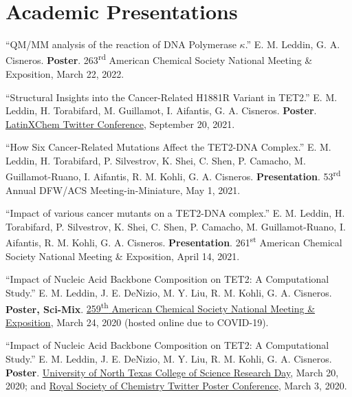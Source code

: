 \documentclass[letterpaper,11pt]{article}
\begin{document}
\section{Academic Presentations}
\begin{etaremune}[start=17]
  \item \textnormal{``QM/MM analysis of the reaction of DNA Polymerase $\kappa$.'' E. M. Leddin, G. A. Cisneros. \textbf{Poster}. 263\textsuperscript{rd} American Chemical Society National Meeting \& Exposition, March 22, 2022.}
  \item \textnormal{``Structural Insights into the Cancer-Related H1881R Variant in TET2.'' E. M. Leddin, H. Torabifard, M. Guillamot, I. Aifantis, G. A. Cisneros. \textbf{Poster}. \href{https://doi.org/10.26226/morressier.616e5c2362ba8657678b1294}{LatinXChem Twitter Conference}, September 20, 2021.}
  \item \textnormal{``How Six Cancer-Related Mutations Affect the
TET2-DNA Complex.'' E. M. Leddin, H. Torabifard, P. Silvestrov, K. Shei, C. Shen, P. Camacho, M. Guillamot-Ruano, I. Aifantis, R. M. Kohli, G. A. Cisneros. \textbf{Presentation}. 53\textsuperscript{rd} Annual DFW/ACS Meeting-in-Miniature, May 1, 2021.}
  \item \textnormal{``Impact of various cancer mutants on a TET2-DNA complex.'' E. M. Leddin, H. Torabifard, P. Silvestrov, K. Shei, C. Shen, P. Camacho, M. Guillamot-Ruano, I. Aifantis, R. M. Kohli, G. A. Cisneros. \textbf{Presentation}. 261\textsuperscript{st} American Chemical Society National Meeting \& Exposition, April 14, 2021.}
  \item \textnormal{``Impact of Nucleic Acid Backbone Composition on TET2: A Computational Study.'' E. M. Leddin, J. E. DeNizio, M. Y. Liu, R. M. Kohli, G. A. Cisneros. \textbf{Poster, Sci-Mix}. \href{https://www.morressier.com/article/impact-nucleic-acid-backbone-composition-tet2-computational-study/5e735fe0cde2b641284a9da2?}{259\textsuperscript{th} American Chemical Society National Meeting \& Exposition}, March 24, 2020 (hosted online due to COVID-19).}
  \item \textnormal{``Impact of Nucleic Acid Backbone Composition on TET2: A Computational Study.'' E. M. Leddin, J. E. DeNizio, M. Y. Liu, R. M. Kohli, G. A. Cisneros. \textbf{Poster}. \href{https://twitter.com/EmLedd1/status/1239679717575360512?s=20}{University of North Texas College of Science Research Day}, March 20, 2020; and \href{https://twitter.com/EmLedd1/status/1234811448720797696?s=20}{Royal Society of Chemistry Twitter Poster Conference}, March 3, 2020.}

\end{etaremune}
\end{document}
